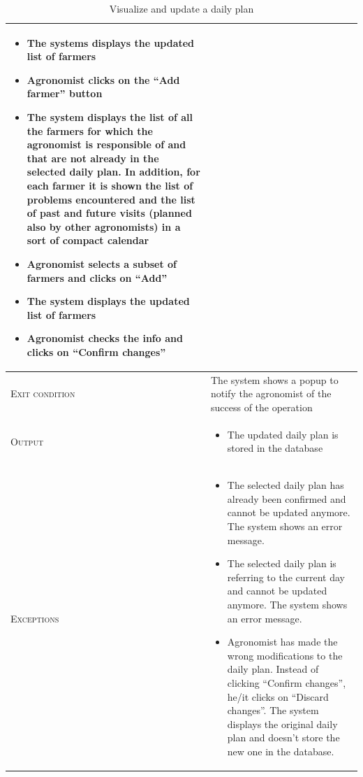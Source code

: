 \begin{table}[H]
\begin{tabular}[c]{|l|p{}|}
\begin{itemize}
                                            \item The systems displays the updated list of farmers
                                            \item Agronomist clicks on the “Add farmer” button
                                            \item The system displays the list of all the farmers for which the agronomist is responsible of and that are not already in the selected daily plan. In addition, for each farmer it is shown the list of problems encountered and the list of past and future visits (planned also by other agronomists) in a sort of compact calendar
                                            \item Agronomist selects a subset of farmers and clicks on “Add”
                                            \item The system displays the updated list of farmers
                                            \item Agronomist checks the info and clicks on “Confirm changes”

                                        \end{itemize}\\
        \hline %
        \textsc{Exit condition}    &  The system shows a popup to notify the agronomist of the success of the operation
        \\
    	\hline %
    	\textsc{Output}             &  \begin{itemize}
    	    \item The updated daily plan is stored in the database
    	\end{itemize}\\
    	\hline %
    	\textsc{Exceptions}         &  \begin{itemize}
    	    \item The selected daily plan has already been confirmed and cannot be updated anymore. The system shows an error message.
    	    \item The selected daily plan is referring to the current day and cannot be updated anymore. The system shows an error message.
    	    \item Agronomist has made the wrong modifications to the daily plan. Instead of clicking “Confirm changes”, he/it clicks on “Discard changes”. The system displays the original daily plan and doesn’t store the new one in the database.    	\end{itemize}\\
    	
    	\hline %
        
    \end{tabular}
    \caption{\label{tab:daily_plan_section_access}Visualize and update a daily plan}
\end{table}

